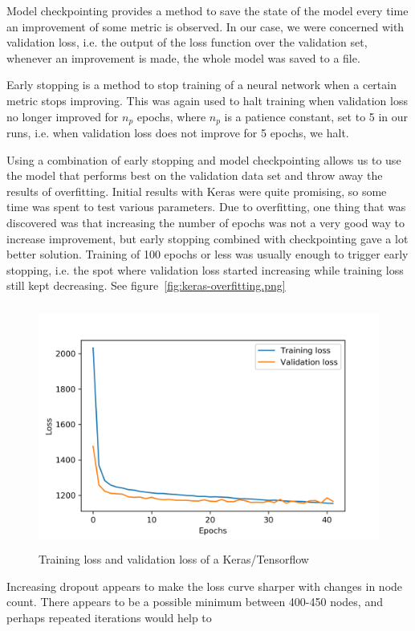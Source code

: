 \documentclass[a4paper]{article}
\begin{document}
Model checkpointing provides a method to save the state of the model every time an improvement of some metric is observed.  In our case, we were concerned with validation loss, i.e. the output of the loss function over the validation set, whenever an improvement is made, the whole model was saved to a file.  

Early stopping is a method to stop training of a neural network when a certain metric stops improving.  This was again used to halt training when validation loss no longer improved for $n_p$ epochs, where $n_p$ is a patience constant, set to 5 in our runs, i.e. when validation loss does not improve for 5 epochs, we halt.  

Using a combination of early stopping and model checkpointing allows us to use the model that performs best on the validation data set and throw away the results of overfitting.  Initial results with Keras were quite promising, so some time was spent to test various parameters.  Due to overfitting, one thing that was discovered was that increasing the number of epochs was not a very good way to increase improvement, but early stopping combined with checkpointing gave a lot better solution.  Training of 100 epochs or less was usually enough to trigger early stopping, i.e. the spot where validation loss started increasing while training loss still kept decreasing. See figure~\ref{fig:keras-overfitting.png}
\begin{figure}[H]
	\centering
	\includegraphics[width=15cm,height=8cm,keepaspectratio]{Images/keras-overfitting.png}
	\caption{Training loss and validation loss of a Keras/Tensorflow }
	\label{fig:keras-search}
\end{figure}

Increasing dropout appears to make the loss curve sharper with changes in node count.  There appears to be a possible minimum between 400-450 nodes, and perhaps repeated iterations would help to 
\end{document}
